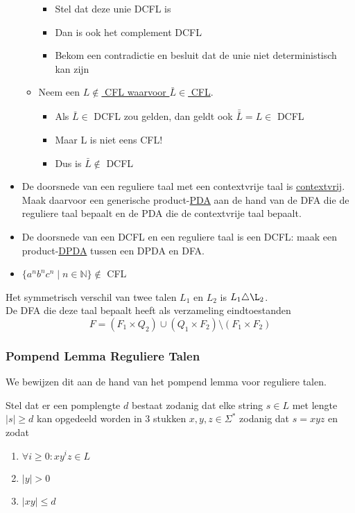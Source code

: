 \documentclass[kulak]{kulakarticle}
\newcommand{\N}{\mathbb{N}}
\newcommand{\abs}[1]{\lvert #1 \rvert}
\theoremstyle{definition}
\begin{document}
\begin{itemize}
\begin{itemize}
\begin{itemize}
				\item Stel dat deze unie DCFL is
				\item Dan is ook het complement DCFL
				\item Bekom een contradictie en besluit dat de unie niet deterministisch kan zijn
			\end{itemize}
			\item Neem een \underline{\(L \notin\) CFL waarvoor \(\bar{L} \in\) CFL}. \begin{itemize}
				\item Als \(\bar{L} \in\) DCFL zou gelden, dan geldt ook \(\bar{\bar{L}}=L\in\) DCFL
				\item Maar L is niet eens CFL!
				\item Dus is \(\bar{L} \notin\) DCFL
			\end{itemize}
		\end{itemize}
		\item De doorsnede van een reguliere taal met een contextvrije taal is \underline{contextvrij}. Maak daarvoor een generische product-\underline{PDA} aan de hand van de DFA die de reguliere taal bepaalt en de PDA die de contextvrije taal bepaalt.
		\item De doorsnede van een DCFL en een reguliere taal is een DCFL: maak een product-\underline{DPDA} tussen een DPDA en DFA.
		\item \( \{a^nb^nc^n \mid n \in \N\} \notin \) CFL
	\end{itemize}

	Het symmetrisch verschil van twee talen \(L_1\) en \(L_2\) is \(
	L_1 \triangle \L_2
	\).\\De DFA die deze taal bepaalt heeft als verzameling eindtoestanden \[
	F = (F_1 \times Q_2) \cup (Q_1 \times F_2) \setminus (F_1 \times F_2) \]

	\subsubsection*{Pompend Lemma Reguliere Talen}

	We bewijzen dit aan de hand van het pompend lemma voor reguliere talen.

	Stel dat er een pomplengte \(d\) bestaat zodanig dat elke string \(s \in L\) met lengte \(\abs{s}\geq d\) kan opgedeeld worden in 3 stukken \(x,y,z \in \Sigma^*\) zodanig dat \(s=xyz\) en zodat\begin{enumerate}
		\item \(\forall i \geq 0 : xy^iz \in L \)
		\item \(\abs{y}>0\)
		\item \(\abs{xy}\leq d\)
	\end{enumerate}
\end{document}
